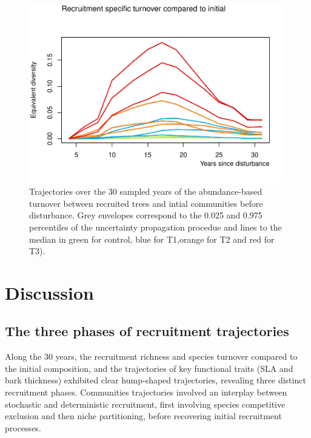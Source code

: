 \documentclass[fleqn,10pt]{ArtEcoFoG} %
\begin{document}
\begin{figure}

{\centering \includegraphics{RecruitmentTrajectories_files/figure-latex/Turnover-1} 

}

\caption{Trajectories over the 30 sampled years of the abundance-based turnover between recruited trees and intial communities before disturbance. Grey envelopes correspond to the 0.025 and 0.975 percentiles of the uncertainty propagation procedue and lines to the median in green for control, blue for T1,orange for T2 and red for T3).}\label{fig:Turnover}
\end{figure}

\section{Discussion}\label{discussion}

\subsection{The three phases of recruitment
trajectories}\label{the-three-phases-of-recruitment-trajectories}

Along the 30 years, the recruitment richness and species turnover
compared to the initial composition, and the trajectories of key
functional traits (SLA and bark thickness) exhibited clear hump-shaped
trajectories, revealing three distinct recruitment phases. Communities
trajectories involved an interplay between stochastic and deterministic
recruitment, first involving species competitive exclusion and then
niche partitioning, before recovering initial recruitment processes.
\end{document}
